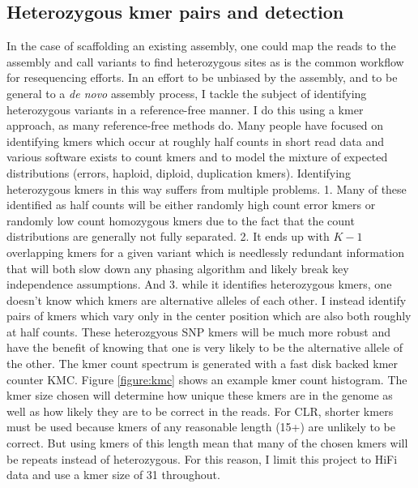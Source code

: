 \subsection{Heterozygous kmer pairs and detection}
\par{
In the case of scaffolding an existing assembly, one could map the reads to the assembly and call variants to find heterozygous sites as is the common workflow for resequencing efforts. In an effort to be unbiased by the 
assembly, and to be general to a \textit{de novo} assembly process, I tackle the subject of identifying heterozygous variants in a reference-free manner. I do this using a kmer approach, as many reference-free methods do. 
Many people have focused on identifying kmers which occur at roughly half counts in short read data\cite{KAT} and various software exists to count kmers\cite{jellyfish} 
and to model the mixture of expected distributions (errors, haploid, diploid, duplication kmers)\cite{genomescope}. Identifying heterozygous kmers in this way 
suffers from multiple problems. 1. Many of these identified as half counts will be either randomly high count error kmers or randomly low count 
homozygous kmers due to the fact that the count distributions are generally not fully separated. 2. It ends up with $K-1$ overlapping kmers for a given variant which is needlessly redundant information that will both slow down any phasing algorithm and 
likely break key independence assumptions. And 3. while it identifies heterozygous kmers, one doesn't know which kmers are alternative alleles of each other. 
I instead identify pairs of kmers which vary only in the center position which are also both roughly at half counts. These heterozgyous SNP kmers 
will be much more robust and have the benefit of knowing that one is very likely to be the alternative allele of the other. The kmer count spectrum is generated with a fast disk backed kmer counter KMC\cite{kmc}\cite{kmc2}\cite{kmc3}. Figure \ref{figure:kmc} shows an example kmer count histogram. The kmer size chosen will determine how unique these kmers are in the genome as well as how likely they are to be correct in the reads. For CLR, shorter kmers must be used because kmers of any reasonable length (15+) are unlikely to be correct. But using kmers of this length mean that many of the chosen kmers will be repeats instead of heterozygous. For this reason, I limit this project to HiFi data and use a kmer size of 31 throughout.
}

